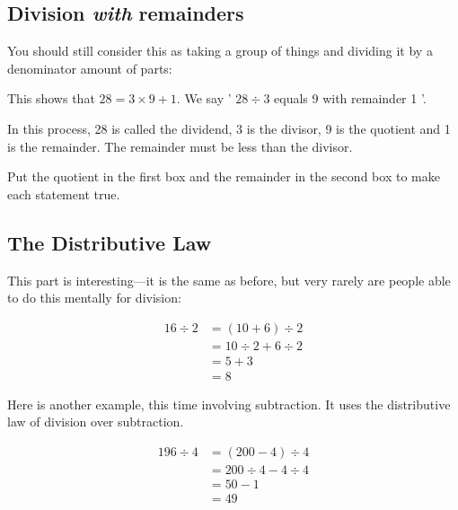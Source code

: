\subsection{Division \emph{with} remainders}
You should still consider this as taking a group of things and dividing it by a denominator amount of parts:


This shows that \(28=3 \times 9+1\). We say ' \(28 \div 3\) equals 9 with remainder 1 '.

In this process, 28 is called the dividend, 3 is the divisor, 9 is the quotient and 1 is the remainder. The remainder must be less than the divisor.

\begin{examples}
    \begin{questions}
        \Question[2] Put the quotient in the first box and the remainder in the second box to make each statement true.\\
    \end{questions}
\end{examples}

\subsection{The Distributive Law}
This part is interesting---it is the same as before, but very rarely are people able to do this mentally for division:

\[
\begin{aligned}
16 \div 2 & =(10+6) \div 2 \\
& =10 \div 2+6 \div 2 \\
& =5+3 \\
& =8
\end{aligned}
\]

Here is another example, this time involving subtraction. It uses the distributive law of division over subtraction.

\[
\begin{aligned}
196 \div 4 & =(200-4) \div 4 \\
& =200 \div 4-4 \div 4 \\
& =50-1 \\
& =49
\end{aligned}
\]

